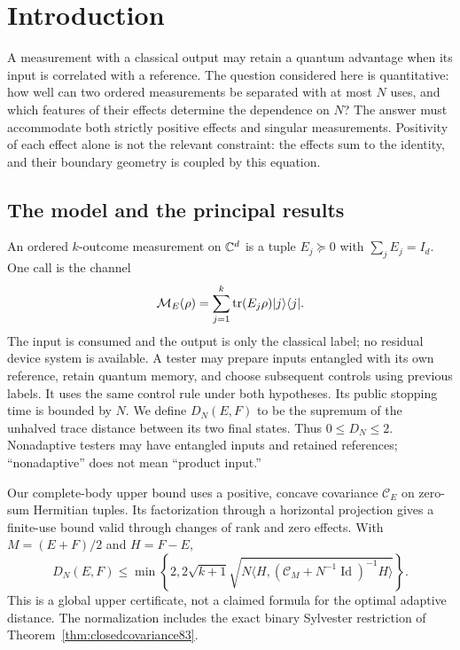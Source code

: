 \section{Introduction}\label{sec:introduction84}
A measurement with a classical output may retain a quantum advantage
when its input is correlated with a reference.  The question considered
here is quantitative: how well can two ordered measurements be
separated with at most $N$ uses, and which features of their effects
determine the dependence on $N$?  The answer must accommodate both
strictly positive effects and singular measurements.  Positivity of
each effect alone is not the relevant constraint: the effects sum to
the identity, and their boundary geometry is coupled by this equation.

\subsection{The model and the principal results}
An ordered $k$-outcome measurement on $\mathbb C^d$ is a tuple
$E_j\succeq0$ with $\sum_jE_j=I_d$.  One call is the channel
\[
 \mathcal M_E(\rho)=\sum_{j=1}^k\operatorname{tr}(E_j\rho)|j\rangle\langle j|.
\]
The input is consumed and the output is only the classical label;
no residual device system is available.  A tester may prepare inputs
entangled with its own reference, retain quantum memory, and choose
subsequent controls using previous labels.  It uses the same control
rule under both hypotheses.  Its public stopping time is bounded
by $N$.  We define $D_N(E,F)$ to be the supremum of the unhalved
trace distance between its two final states.  Thus $0\le D_N\le2$.
Nonadaptive testers may have entangled inputs and retained references;
``nonadaptive'' does not mean ``product input.''

Our complete-body upper bound uses a positive, concave covariance
$\mathcal C_E$ on zero-sum Hermitian tuples.  Its factorization through
a horizontal projection gives a finite-use bound valid through changes
of rank and zero effects.  With $M=(E+F)/2$ and $H=F-E$,
\begin{equation}\label{eq:frontupper84}
 D_N(E,F)\le\min\left\{2,2\sqrt{k+1}
  \sqrt{N\langle H,(\mathcal C_M+N^{-1}\operatorname{Id})^{-1}H\rangle}
                              \right\}.
\end{equation}
This is a global upper certificate, not a claimed formula for the
optimal adaptive distance.  The normalization includes the exact
binary Sylvester restriction of Theorem~\ref{thm:closedcovariance83}.

